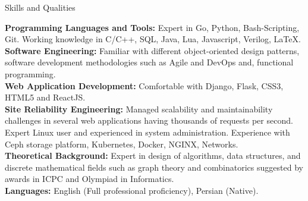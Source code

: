 \documentclass{resume} %
\begin{document}
\begin{rSection}{Skills and Qualities}

	{\bf Programming Languages and Tools:}
	Expert in Go, Python, Bash-Scripting, Git. Working knowledge in C/C++, SQL, Java, Lua, Javascript, Verilog, \LaTeX. \smallskip
	\\
	{\bf Software Engineering:}
	Familiar with different object-oriented design patterns, software development methodologies such as Agile and DevOps and, functional programming.\smallskip
	\\
	{\bf Web Application Development:}
	Comfortable with Django, Flask, CSS3, HTML5 and ReactJS.\smallskip
	\\
	{\bf Site Reliability Engineering:}
	Managed scalability and maintainability challenges in several web applications having thousands of requests per second.
	Expert Linux user and experienced in system administration.
	Experience with Ceph storage platform, Kubernetes, Docker, NGINX, Networks.\smallskip
	\\
	{\bf Theoretical Background:}
	Expert in design of algorithms, data structures, and discrete mathematical fields such as graph theory and combinatorics suggested by awards in ICPC and Olympiad in Informatics.\smallskip
	\\
	{\bf Languages:}
	English (Full professional proficiency), Persian (Native).\smallskip

\end{rSection}
	
\end{document}
